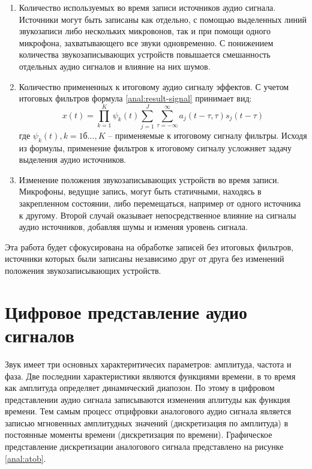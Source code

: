 \begin{enumerate}
	\item Количество используемых во время записи источников аудио сигнала. Источники могут быть записаны как отдельно, с помощью выделенных линий звукозаписи либо нескольких микровонов, так и при помощи одного микрофона, захватывающего все звуки одновременно. С понижением количества звукозаписывающих устройств повышается смешанность отдельных аудио сигналов и влияние на них шумов.
	\item Количество примененных к итоговому аудио сигналу эффектов. С учетом итоговых фильтров формула \ref{anal:result-signal} принимает вид:
	\begin{equation}
	x(t) =\prod_{k=1}^K \psi_{k}(t) \sum_{j=1}^{J} \sum_{\tau=-\infty}^{\infty} a_{j}(t-\tau, \tau)s_j(t-\tau)
	\label{anal:filtered-signal}
	\end{equation}
	где $\psi_{k}(t), k=1б ..., K$ -- применяемые к итоговому сигналу фильтры.
	Исходя из формулы, применение фильтров к итоговому сигналу усложняет задачу выделения аудио источников.
	\item Изменение положения звукозаписывающих устройств во время записи. Микрофоны, ведущие запись, могут быть статичными, находясь в закрепленном состоянии, либо перемещаться, например от одного источника к другому. Второй случай оказывает непосредственное влияние на сигналы аудио источников, добавляя шумы и изменяя уровень сигнала.
\end{enumerate}

Эта работа будет сфокусирована на обработке записей без итоговых фильтров, источники которых были записаны независимо друг от друга без изменений положения звукозаписывающих устройств.

\section{Цифровое представление аудио сигналов}

Звук имеет три основных характеритичесих параметров: амплитуда, частота и фаза. Две последнии характеристики являются функциями времени, в то время как амплитуда определяет динамический диапозон. По этому в цифровом представлении аудио сигнала записываются изменения аплитуды как функция времени. Тем самым процесс отцифровки аналогового аудио сигнала является записью мгновенных амплитудных значений (дискретизация по амплитуда) в постоянные моменты времени (дискретизация по времени). Графическое представление дискретизации аналогового сигнала представлено на рисунке \ref{anal:atob}.

